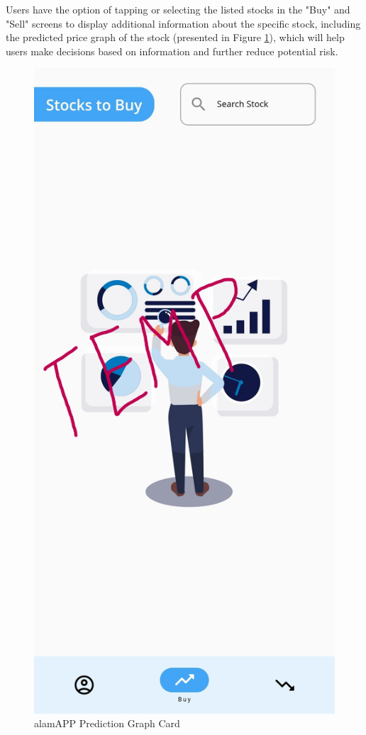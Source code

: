\FloatBarrier


Users have the option of tapping or selecting the listed stocks in the "Buy" and "Sell" screens 
to display additional information about the specific stock, including the predicted price graph 
of the stock (presented in Figure \ref{fig:alamAPP_predCard}), which will help users make 
decisions based on information and further reduce potential risk.
\begin{figure}[ht]
  \centering
  \includegraphics[height=0.40\textheight]{./assets/Chapter_4/mobile_ui/temp.jpg}
  \caption{alamAPP Prediction Graph Card}
  \label{fig:alamAPP_predCard}
\end{figure}
\FloatBarrier

